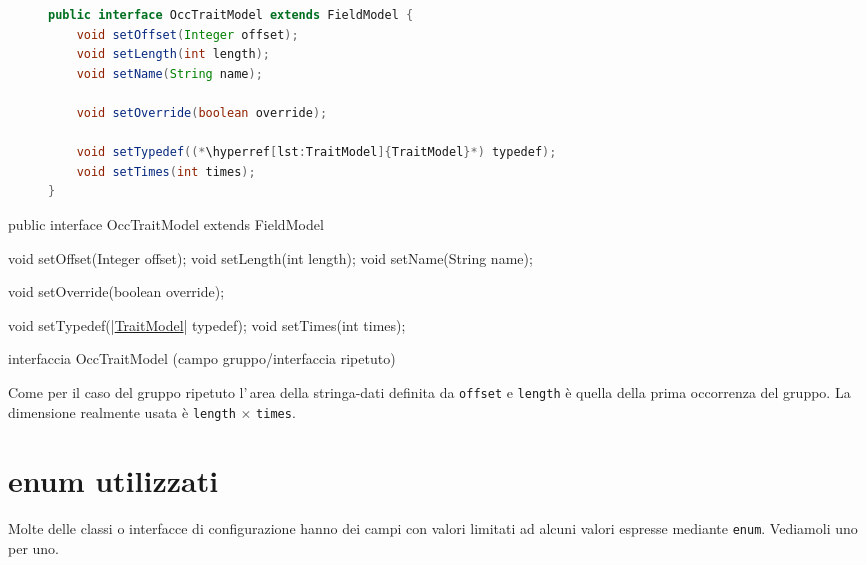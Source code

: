 \ifesource
\begin{figure*}[!htb]
\begin{lstlisting}[language=java, 
caption=interfaccia OccTraitModel (campo gruppo/interfaccia ripetuto), 
label=lst:OccTraitModel]
public interface OccTraitModel extends FieldModel {
    void setOffset(Integer offset);
    void setLength(int length);
    void setName(String name);
    
    void setOverride(boolean override);
    
    void setTypedef((*\hyperref[lst:TraitModel]{TraitModel}*) typedef);
    void setTimes(int times);
}
\end{lstlisting}
\end{figure*}
\else
\begin{elisting}[!htb]
\begin{javacode}
public interface OccTraitModel extends FieldModel {
    void setOffset(Integer offset);
    void setLength(int length);
    void setName(String name);
    
    void setOverride(boolean override);
    
    void setTypedef(|\hyperref[lst:TraitModel]{TraitModel}| typedef);
    void setTimes(int times);
}
\end{javacode}
\caption{interfaccia OccTraitModel (campo gruppo/interfaccia ripetuto)}
\label{lst:OccTraitModel}
\end{elisting}
\fi
Come per il caso del gruppo ripetuto l'\,area della stringa-dati definita 
da \verb!offset! e \verb!length! è quella della prima occorrenza del gruppo. 
La dimensione realmente usata è \verb!length! $\times$ \verb!times!.

\vspace*{5cm}

\chapter{enum utilizzati}
Molte delle classi o interfacce di configurazione hanno dei campi con valori
limitati ad alcuni valori espresse mediante \texttt{enum}.
Vediamoli uno per uno.

